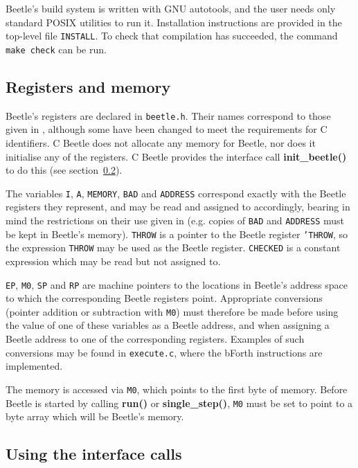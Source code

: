 \documentclass{article}
\begin{document}
Beetle's build system is written with GNU autotools, and the user
needs only standard POSIX utilities to run it. Installation
instructions are provided in the top-level file {\tt INSTALL}. To
check that compilation has succeeded, the command {\tt make check} can
be run.


\subsection{Registers and memory}

Beetle's registers are declared in {\tt beetle.h}. Their names correspond to
those given in \cite[section~A.2.1]{beetledis}, although some have been changed
to meet the requirements for C identifiers. C Beetle does not allocate any
memory for Beetle, nor does it initialise any of the registers. C Beetle
provides the interface call {\bf init\_beetle()} to do this (see
section~\ref{usingcalls}).

The variables {\tt I}, {\tt A}, {\tt MEMORY}, {\tt BAD} and {\tt ADDRESS}
correspond exactly with the Beetle registers they represent, and may be read
and assigned to accordingly, bearing in mind the restrictions on their use
given in \cite{beetledis} (e.g. copies of {\tt BAD} and {\tt ADDRESS} must be
kept in Beetle's memory). {\tt THROW} is a pointer to the Beetle register
{\tt 'THROW}, so the expression {\tt *THROW} may be used as the Beetle
register. {\tt CHECKED} is a constant expression which may be read but not
assigned to.

{\tt EP}, {\tt M0}, {\tt SP} and {\tt RP} are machine pointers to the
locations in Beetle's address space to which the corresponding Beetle
registers point. Appropriate conversions (pointer addition or subtraction
with {\tt M0}) must therefore be made before using the value of one of these
variables as a Beetle address, and when assigning a Beetle address to one of
the corresponding registers. Examples of such conversions may be found in
{\tt execute.c}, where the bForth instructions are implemented.

The memory is accessed via {\tt M0}, which points to the first byte of
memory. Before Beetle is started by calling {\bf run()} or {\bf
single\_step()}, {\tt M0} must be set to point to a byte array which will be
Beetle's memory.


\subsection{Using the interface calls}
\label{usingcalls}
\end{document}
